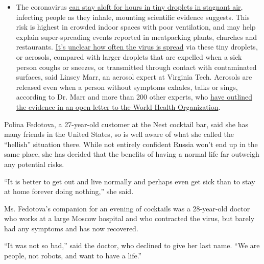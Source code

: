 \begin{itemize}
  \begin{itemize}
  \tightlist
  \item
    The coronavirus
    \href{https://www.nytimes3xbfgragh.onion/2020/07/04/health/239-experts-with-one-big-claim-the-coronavirus-is-airborne.html?action=click\&pgtype=Article\&state=default\&region=MAIN_CONTENT_3\&context=storylines_faq}{can
    stay aloft for hours in tiny droplets in stagnant air}, infecting
    people as they inhale, mounting scientific evidence suggests. This
    risk is highest in crowded indoor spaces with poor ventilation, and
    may help explain super-spreading events reported in meatpacking
    plants, churches and restaurants.
    \href{https://www.nytimes3xbfgragh.onion/2020/07/06/health/coronavirus-airborne-aerosols.html?action=click\&pgtype=Article\&state=default\&region=MAIN_CONTENT_3\&context=storylines_faq}{It's
    unclear how often the virus is spread} via these tiny droplets, or
    aerosols, compared with larger droplets that are expelled when a
    sick person coughs or sneezes, or transmitted through contact with
    contaminated surfaces, said Linsey Marr, an aerosol expert at
    Virginia Tech. Aerosols are released even when a person without
    symptoms exhales, talks or sings, according to Dr. Marr and more
    than 200 other experts, who
    \href{https://academic.oup.com/cid/article/doi/10.1093/cid/ciaa939/5867798}{have
    outlined the evidence in an open letter to the World Health
    Organization}.
  \end{itemize}
\end{itemize}

Polina Fedotova, a 27-year-old customer at the Nest cocktail bar, said
she has many friends in the United States, so is well aware of what she
called the ``hellish'' situation there. While not entirely confident
Russia won't end up in the same place, she has decided that the benefits
of having a normal life far outweigh any potential risks.

``It is better to get out and live normally and perhaps even get sick
than to stay at home forever doing nothing,'' she said.

Ms. Fedotova's companion for an evening of cocktails was a 28-year-old
doctor who works at a large Moscow hospital and who contracted the
virus, but barely had any symptoms and has now recovered.

``It was not so bad,'' said the doctor, who declined to give her last
name. ``We are people, not robots, and want to have a life.''

